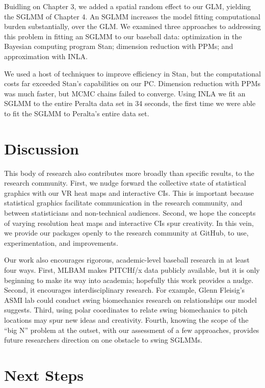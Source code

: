 Buidling on Chapter 3, we added a spatial random effect to our GLM, yielding the SGLMM of Chapter 4. An SGLMM increases the model fitting computational burden substantially, over the GLM. We examined three approaches to addressing this problem in fitting an SGLMM to our baseball data: optimization in the Bayesian computing program Stan; dimension reduction with PPMs; and approximation with INLA. 

We used a host of techniques to improve efficiency in Stan, but the computational costs far exceeded Stan's capabilities on our PC. Dimension reduction with PPMs was much faster, but MCMC chains failed to converge. Using INLA we fit an SGLMM to the entire Peralta data set in 34 seconds, the first time we were able to fit the SGLMM to Peralta's entire data set.

\section{Discussion}
This body of research also contributes more broadly than specific results, to the research community. First, we nudge forward the collective state of statistical graphics with our VR heat maps and interactive CIs. This is important because statistical graphics facilitate communication in the research community, and between statisticians and non-technical audiences. Second, we hope the concepts of varying resolution heat maps and interactive CIs spur creativity. In this vein, we provide our packages openly to the research community at GitHub, to use, experimentation, and improvements.

Our work also encourages rigorous, academic-level baseball research in at least four ways. First, MLBAM\textsuperscript{\textregistered} makes PITCHf/x\textsuperscript{\textregistered} data publicly available, but it is only beginning to make its way into academia; hopefully this work provides a nudge. Second, it encourages interdisciplinary research. For example, Glenn Fleisig's ASMI lab could conduct swing biomechanics research on relationships our model suggests. Third, using polar coordinates to relate swing biomechanics to pitch locations may spur new ideas and creativity. Fourth, knowing the scope of the ``big N'' problem at the outset, with our assessment of a few approaches, provides future researchers direction on one obstacle to swing SGLMMs.

\section{Next Steps}

